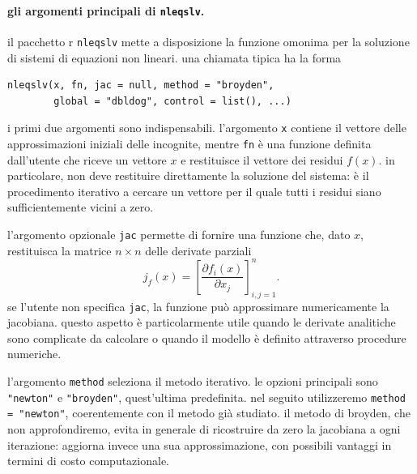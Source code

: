 \paragraph{gli argomenti principali di \texttt{nleqslv}.}
il pacchetto r \texttt{nleqslv} mette a disposizione la funzione omonima per la soluzione di sistemi di equazioni non lineari. una chiamata tipica ha la forma
\begin{verbatim}
nleqslv(x, fn, jac = null, method = "broyden",
        global = "dbldog", control = list(), ...)
\end{verbatim}
i primi due argomenti sono indispensabili. l'argomento \texttt{x} contiene il vettore delle approssimazioni iniziali delle incognite, mentre \texttt{fn} è una funzione definita dall'utente che riceve un vettore $x$ e restituisce il vettore dei residui $f(x)$. in particolare, non deve restituire direttamente la soluzione del sistema: è il procedimento iterativo a cercare un vettore per il quale tutti i residui siano sufficientemente vicini a zero.

l'argomento opzionale \texttt{jac} permette di fornire una funzione che, dato $x$, restituisca la matrice $n\times n$ delle derivate parziali
\begin{equation*}
 j_f(x)=\left[\frac{\partial f_i(x)}{\partial x_j}\right]_{i,j=1}^n.
 \label{eq:nleqslv_jacobiana}
\end{equation*}
se l'utente non specifica \texttt{jac}, la funzione può approssimare numericamente la jacobiana. questo aspetto è particolarmente utile quando le derivate analitiche sono complicate da calcolare o quando il modello è definito attraverso procedure numeriche.

l'argomento \texttt{method} seleziona il metodo iterativo. le opzioni principali sono \texttt{"newton"} e \texttt{"broyden"}, quest'ultima predefinita. nel seguito utilizzeremo \texttt{method = "newton"}, coerentemente con il metodo già studiato. il metodo di broyden, che non approfondiremo, evita in generale di ricostruire da zero la jacobiana a ogni iterazione: aggiorna invece una sua approssimazione, con possibili vantaggi in termini di costo computazionale.


